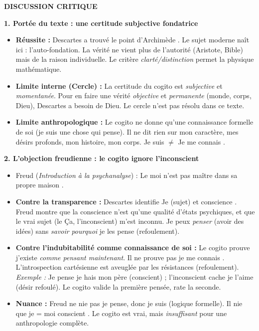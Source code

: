 \documentclass[11pt]{article}
\newcommand{\cle}[1]{{\popxbold\color{popdark}#1}}
\begin{document}
\begin{corrige}
\textbf{DISCUSSION CRITIQUE}

\textbf{1. Portée du texte : une certitude subjective fondatrice}
\begin{itemize}
\item \textbf{Réussite :} Descartes a trouvé le \guillemotleft point d'Archimède \guillemotright. Le sujet moderne naît ici : \cle{l'auto-fondation}. La vérité ne vient plus de l'autorité (Aristote, Bible) mais de la \cle{raison individuelle}. Le critère \emph{clarté/distinction} permet la physique mathématique.
\item \textbf{Limite interne (Cercle) :} La certitude du cogito est \emph{subjective} et \emph{momentanée}. Pour en faire une vérité \emph{objective} et \emph{permanente} (monde, corps, Dieu), Descartes a besoin de Dieu. Le cercle n'est pas résolu dans ce texte.
\item \textbf{Limite anthropologique :} Le cogito ne donne qu'une \cle{connaissance formelle} de soi (je suis une chose qui pense). Il ne dit rien sur mon \cle{caractère}, mes \cle{désirs profonds}, mon \cle{histoire}, mon \cle{corps}. \guillemotleft Je suis \guillemotright $\neq$ \guillemotleft Je me connais \guillemotright.
\end{itemize}

\textbf{2. L'objection freudienne : le cogito ignore l'inconscient}
\begin{itemize}
\item Freud (\emph{Introduction à la psychanalyse}) : \guillemotleft Le moi n'est pas maître dans sa propre maison \guillemotright.
\item \textbf{Contre la transparence :} Descartes identifie \guillemotleft Je \guillemotright (sujet) et \guillemotleft conscience \guillemotright. Freud montre que la conscience n'est qu'une \cle{qualité} d'états psychiques, et que le \cle{vrai sujet} (le Ça, l'inconscient) m'est inconnu. Je peux \emph{penser} (avoir des idées) sans \emph{savoir} \emph{pourquoi} je les pense (refoulement).
\item \textbf{Contre l'indubitabilité comme connaissance de soi :} Le cogito prouve \guillemotleft j'existe \guillemotright \emph{comme pensant maintenant}. Il ne prouve pas \guillemotleft je me connais \guillemotright. L'introspection cartésienne est aveuglée par les \cle{résistances} (refoulement). \textit{Exemple :} Je pense \guillemotleft je hais mon père \guillemotright (conscient) ; l'inconscient cache \guillemotleft je l'aime \guillemotright (désir refoulé). Le cogito valide la première pensée, rate la seconde.
\item \textbf{Nuance :} Freud ne nie pas \guillemotleft je pense, donc je suis \guillemotright (logique formelle). Il nie que \guillemotleft je \guillemotright = \guillemotleft moi conscient \guillemotright. Le cogito est vrai, mais \emph{insuffisant} pour une anthropologie complète.
\end{itemize}


\end{corrige}
\end{document}
